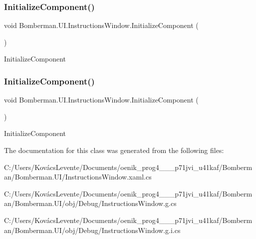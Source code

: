 \subsubsection{\texorpdfstring{InitializeComponent()}{InitializeComponent()}\hspace{0.1cm}{\footnotesize\ttfamily [1/2]}}
{\footnotesize\ttfamily void Bomberman.\+U\+I.\+Instructions\+Window.\+Initialize\+Component (\begin{DoxyParamCaption}{ }\end{DoxyParamCaption})\hspace{0.3cm}{\ttfamily [inline]}}



Initialize\+Component 

\mbox{\label{class_bomberman_1_1_u_i_1_1_instructions_window_ad6e609958359984dc900ed1f68741efa}} 
\subsubsection{\texorpdfstring{InitializeComponent()}{InitializeComponent()}\hspace{0.1cm}{\footnotesize\ttfamily [2/2]}}
{\footnotesize\ttfamily void Bomberman.\+U\+I.\+Instructions\+Window.\+Initialize\+Component (\begin{DoxyParamCaption}{ }\end{DoxyParamCaption})\hspace{0.3cm}{\ttfamily [inline]}}



Initialize\+Component 



The documentation for this class was generated from the following files\+:\begin{DoxyCompactItemize}
\item 
C\+:/\+Users/\+Kovács\+Levente/\+Documents/oenik\+\_\+prog4\+\_\+\_\+\_\+p71jvi\+\_\+u41kaf/\+Bomberman/\+Bomberman.\+U\+I/Instructions\+Window.\+xaml.\+cs\item 
C\+:/\+Users/\+Kovács\+Levente/\+Documents/oenik\+\_\+prog4\+\_\+\_\+\_\+p71jvi\+\_\+u41kaf/\+Bomberman/\+Bomberman.\+U\+I/obj/\+Debug/Instructions\+Window.\+g.\+cs\item 
C\+:/\+Users/\+Kovács\+Levente/\+Documents/oenik\+\_\+prog4\+\_\+\_\+\_\+p71jvi\+\_\+u41kaf/\+Bomberman/\+Bomberman.\+U\+I/obj/\+Debug/Instructions\+Window.\+g.\+i.\+cs\end{DoxyCompactItemize}
